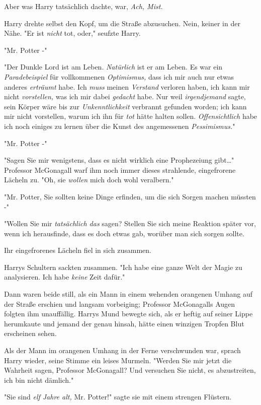 {Aber was Harry tatsächlich dachte, war, \emph{Ach, Mist.}

Harry drehte selbst den Kopf, um die Straße abzusuchen. Nein, keiner in der Nähe. "Er ist \emph{nicht} tot, oder," seufzte Harry.

"Mr. Potter -"

"Der Dunkle Lord ist am Leben. \emph{Natürlich} ist er am Leben. Es war ein \emph{Paradebeispiel} für vollkommenen \emph{Optimismus,} dass ich mir auch nur etwas anderes \emph{erträumt} habe. Ich \emph{muss} meinen \emph{Verstand} verloren haben, ich kann mir nicht \emph{vorstellen,} was ich mir dabei \emph{gedacht} habe. Nur weil \emph{irgendjemand} sagte, sein Körper wäre bis zur \emph{Unkenntlichkeit} verbrannt gefunden worden; ich kann mir nicht vorstellen, warum ich ihn für \emph{tot} hätte halten sollen. \emph{Offensichtlich} habe ich noch einiges zu lernen über die Kunst des angemessenen \emph{Pessimismus.}"

"Mr. Potter -"

"Sagen Sie mir wenigstens, dass es nicht wirklich eine Prophezeiung gibt…" Professor McGonagall warf ihm noch immer dieses strahlende, eingefrorene Lächeln zu. "Oh, sie \emph{wollen} mich doch wohl veralbern."

"Mr. Potter, Sie sollten keine Dinge erfinden, um die sich Sorgen machen müssten -"

"Wollen Sie mir \emph{tatsächlich das} sagen? Stellen Sie sich meine Reaktion später vor, wenn ich herausfinde, dass es doch etwas gab, worüber man sich sorgen sollte.

Ihr eingefrorenes Lächeln fiel in sich zusammen.

Harrys Schultern sackten zusammen. "Ich habe eine ganze Welt der Magie zu analysieren. Ich habe \emph{keine} Zeit dafür."

Dann waren beide still, als ein Mann in einem wehenden orangenen Umhang auf der Straße erschien und langsam vorbeiging; Professor McGonagalls Augen folgten ihm unauffällig. Harrys Mund bewegte sich, als er heftig auf seiner Lippe herumkaute und jemand der genau hinsah, hätte einen winzigen Tropfen Blut erscheinen sehen.

Als der Mann im orangenen Umhang in der Ferne verschwunden war, sprach Harry wieder, seine Stimme ein leises Murmeln. "Werden Sie mir jetzt die Wahrheit sagen, Professor McGonagall? Und versuchen Sie nicht, es abzustreiten, ich bin nicht dämlich."

"Sie sind \emph{elf Jahre alt,} Mr. Potter!" sagte sie mit einem strengen Flüstern.

}
